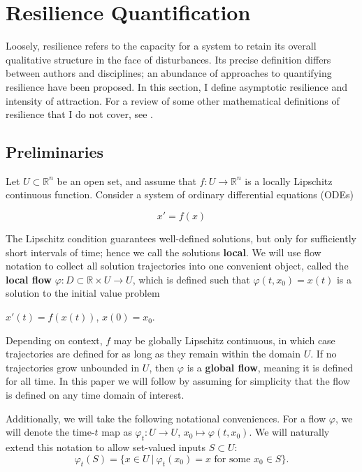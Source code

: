 \section{Resilience Quantification}
\label{sec:resilience}

Loosely, resilience refers to the capacity for a system to retain its overall qualitative structure in the face of disturbances. Its precise definition differs between authors and disciplines; an abundance of approaches to quantifying resilience have been proposed. 
%
In this section, I define asymptotic resilience and intensity of attraction. 
%
For a review of some other mathematical definitions of resilience that I do not cover, see \cite{meyerMathematicalReviewResilience2016}.


\subsection{Preliminaries}
Let $U \subset \mathbb{R}^n$ be an open set, and assume that $f : U \to \mathbb{R}^n$ is a locally Lipschitz continuous function. Consider a system of ordinary differential equations (ODEs) 

\begin{equation}
	\label{eqn:ode}
	x' = f(x)
\end{equation}

The Lipschitz condition guarantees well-defined solutions, but only for sufficiently short intervals of time; hence we call the solutions \textbf{local}. We will use flow notation to collect all solution trajectories into one convenient object, called the \textbf{local flow} $\varphi: D \subset \mathbb{R} \times U \to U$, which is defined such that $\varphi(t,x_0) = x(t)$ is a solution to the initial value problem \begin{center}
	$x'(t) = f(x(t))$, \hspace{0.25in} $x(0) = x_0$. 
\end{center}

Depending on context, $f$ may be globally Lipschitz continuous, in which case trajectories are defined for as long as they remain within the domain $U$. If no trajectories grow unbounded in $U$, then $\varphi$ is a \textbf{global flow}, meaning it is defined for all time. In this paper we will follow \cite{meyerMetricPropertiesAttractors2019} by assuming for simplicity that the flow is defined on any time domain of interest. 

Additionally, we will take the following notational conveniences. For a flow $\varphi$, we will denote the time-$t$ map as $\varphi_t: U \to U$, $x_0 \mapsto \varphi(t,x_0)$. We will naturally extend this notation to allow set-valued inputs $S\subset U$: $$\varphi_t(S) = \{x\in U ~| ~\varphi_t(x_0) = x \text{ for some } x_0 \in S\}.$$


